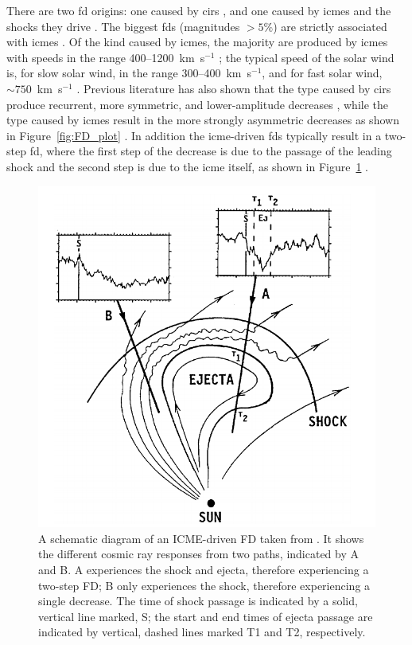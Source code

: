 There are two \gls{fd} origins: one caused by \glspl{cir} \citep{dumbovic_forbush_2016}, and one caused by \glspl{icme} and the shocks they drive \citep{belov_forbush_2008}. The biggest \glspl{fd} (magnitudes $> 5\%$) are strictly associated with \glspl{icme} \citep{belov_what_2001}. Of the kind caused by \glspl{icme}, the majority are produced by \glspl{icme} with speeds in the range 400--1200~km~s$^{-1}$ \citep{lingri_forbush_2016}; the typical speed of the solar wind is, for slow solar wind, in the range 300--400~km~s$^{-1}$, and for fast solar wind, $\sim 750$~km~s$^{-1}$ \citep{owens_heliospheric_2013}. Previous literature has also shown that the type caused by \glspl{cir} produce recurrent, more symmetric, and lower-amplitude decreases \citep{dumbovic_cosmic_2012}, while the type caused by \glspl{icme} result in the more strongly asymmetric decreases as shown in Figure~\ref{fig:FD_plot} \citep{lockwood_forbush_1971, cane_coronal_2000, dumbovic_cosmic_2012}. In addition the \gls{icme}-driven \glspl{fd} typically result in a two-step \gls{fd}, where the first step of the decrease is due to the passage of the leading shock and the second step is due to the \gls{icme} itself, as shown in Figure~\ref{fig:FD_CME} \citep{cane_coronal_2000}.

\begin{figure}[ht!]
	\centering
	\includegraphics[width=0.75\columnwidth]{FD_CME.png}
	\caption{A schematic diagram of an ICME-driven FD taken from \citet{cane_coronal_2000}. It shows the different cosmic ray responses from two paths, indicated by A and B. A experiences the shock and ejecta, therefore experiencing a two-step FD; B only experiences the shock, therefore experiencing a single decrease. The time of shock passage is indicated by a solid, vertical line marked, S; the start and end times of ejecta passage are indicated by vertical, dashed lines marked T1 and T2, respectively.}
	\label{fig:FD_CME}
\end{figure}

